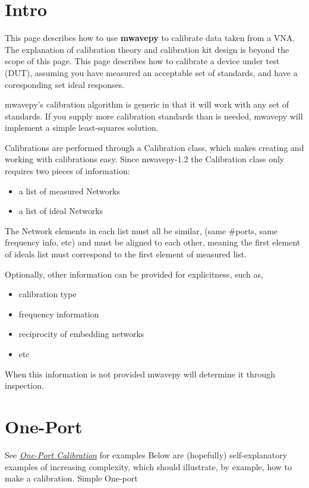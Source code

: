 \documentclass[letterpaper,10pt,english]{sphinxmanual}
\begin{document}
\section{Intro}
\label{calibration:intro}
This page describes how to use \textbf{mwavepy} to calibrate data taken from a VNA. The explanation of calibration theory and calibration kit design is beyond the scope of this  page. This page describes how to calibrate a device under test (DUT), assuming you have measured an acceptable set of standards, and have a coresponding set ideal responses.

mwavepy's calibration algorithm is generic in that it will work with any set of standards. If you supply more calibration standards than is needed, mwavepy will implement a simple least-squares solution.

Calibrations are performed through a Calibration class, which makes creating and working with calibrations easy. Since mwavepy-1.2 the Calibration class only requires two pieces of information:
\begin{itemize}
\item {} 
a list of measured Networks

\item {} 
a list of ideal Networks

\end{itemize}

The Network elements in each list must all be similar, (same \#ports, same frequency info, etc) and must be aligned to each other, meaning the first element of ideals list must correspond to the first element of measured list.

Optionally, other information can be provided for explicitness, such as,
\begin{itemize}
\item {} 
calibration type

\item {} 
frequency information

\item {} 
reciprocity of embedding networks

\item {} 
etc

\end{itemize}

When this information is not provided mwavepy will determine it through inspection.


\section{One-Port}
\label{calibration:one-port}
See {\hyperref[example_oneport_calibration::doc]{\emph{One-Port Calibration}}} for examples
Below are (hopefully) self-explanatory examples of increasing complexity, which should illustrate, by example, how to make a calibration.
Simple One-port
\end{document}
